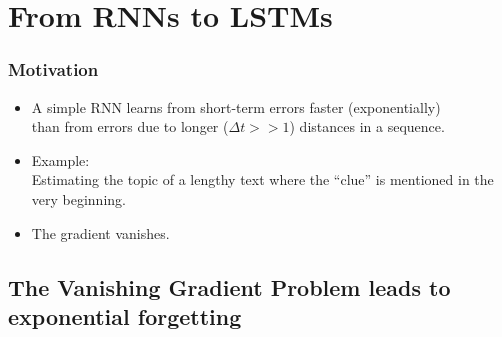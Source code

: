 \section{From RNNs to LSTMs}



\begin{frame}\frametitle{Motivation}
	\begin{itemize}
	\setlength\itemsep{1cm}
	\item[]
	A simple RNN learns from short-term errors faster (exponentially)\\
	than from errors due to longer ($\Delta t >\!\!> 1$) distances in a sequence.\\
	
	\item[]Example:\\Estimating the topic of a lengthy text where the ``clue'' is mentioned in the very beginning.\\
	
	\item[]The gradient vanishes.
	\end{itemize}
\end{frame}

\subsection{The Vanishing Gradient Problem leads to exponential forgetting}

